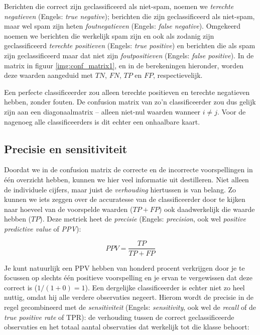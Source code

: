 Berichten die correct zijn geclassificeerd als niet-spam, noemen we \textit{terechte negatieven} (Engels: \textit{true negative}); berichten die zijn geclassificeerd als niet-spam, maar wel spam zijn heten \textit{foutnegatieven} (Engels: \textit{false negative}). Omgekeerd noemen we berichten die werkelijk spam zijn en ook als zodanig zijn geclassificeerd \textit{terechte positieven} (Engels: \textit{true positive}) en berichten die als spam zijn geclassificeerd maar dat niet zijn \textit{foutpositieven} (Engels: \textit{false positive}). In de matrix in figuur \ref{img:conf_matrix1}, en in de berekeningen hieronder, worden deze waarden aangeduid met $TN$, $FN$, $TP$ en $FP$, respectievelijk.

Een perfecte classificeerder zou alleen terechte positieven en terechte negatieven hebben, zonder fouten. De confusion matrix van zo'n classificeerder zou dus gelijk zijn aan een diagonaalmatrix – alleen niet-nul waarden wanneer $i \neq j$. Voor de nagenoeg alle classificeerders is dit echter een onhaalbare kaart.

\subsection{Precisie en sensitiviteit}
Doordat we in de confusion matrix de correcte en de incorrecte voorspellingen in één overzicht hebben, kunnen we hier veel informatie uit destilleren. Niet alleen de individuele cijfers, maar juist de \textit{verhouding} hiertussen is van belang. Zo kunnen we iets zeggen over de accuratesse van de classificeerder door te kijken naar hoeveel van de voorspelde waarden ($TP+FP$) ook daadwerkelijk die waarde hebben ($TP$). Deze metriek heet de \textit{precisie} (Engels: \textit{precision}, ook wel \textit{positive predictive value} of \textit{PPV}):

\[
  PPV = \frac{TP}{TP+FP}
\]

Je kunt natuurlijk een PPV hebben van honderd procent verkrijgen door je te focussen op slechts één positieve voorspelling en je ervan te vergewissen dat deze correct is ($1/(1+0)=1$). Een dergelijke classificeerder is echter niet zo heel nuttig, omdat hij alle verdere observaties negeert. Hierom wordt de precisie in de regel gecombineerd met de \textit{sensitiviteit} (Engels: \textit{sensitivity}, ook wel de \textit{recall} of de  \textit{true positive rate} of TPR): de verhouding tussen de correct geclassificeerde observaties en het totaal aantal observaties dat werkelijk tot die klasse behoort:


